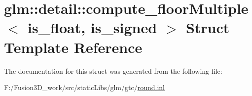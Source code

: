 \hypertarget{structglm_1_1detail_1_1compute__floor_multiple}{}\section{glm\+:\+:detail\+:\+:compute\+\_\+floor\+Multiple$<$ is\+\_\+float, is\+\_\+signed $>$ Struct Template Reference}
\label{structglm_1_1detail_1_1compute__floor_multiple}


The documentation for this struct was generated from the following file\+:\begin{DoxyCompactItemize}
\item 
F\+:/\+Fusion3\+D\+\_\+work/src/static\+Libs/glm/gtc/\hyperlink{round_8inl}{round.\+inl}\end{DoxyCompactItemize}
